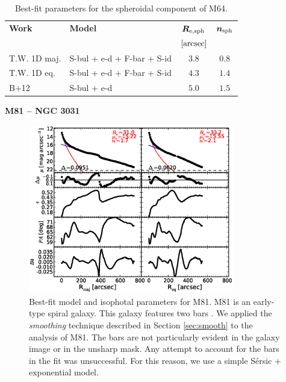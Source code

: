 \documentclass[preprint2]{emulateapj}
\newcommand{\fitfigurewidth}{0.8\textwidth}
\begin{document}
  \begin{table}[h]
  \small
  \caption{Best-fit parameters for the spheroidal component of M64.}
  \begin{center}
  \begin{tabular}{llcc}
  \hline
  {\bf Work} & {\bf Model}   & $\bm R_{\rm e,sph}$    & $\bm n_{\rm sph}$ \\
    &  &  $[\rm arcsec]$ & \\
  \hline
  T.W. 1D maj. & S-bul + e-d + F-bar + S-id  & $3.8$  &  $0.8$ \\
  T.W. 1D eq.  & S-bul + e-d + F-bar + S-id  & $4.3$  &  $1.4$ \\
  \hline
  B+12      & S-bul + e-d  & $5.0$  &  $1.5$ \\
  \hline
  \end{tabular}
  \end{center}
  \label{tab:m64}
  \end{table}


  \clearpage\newpage\noindent
  {\bf M81 -- NGC 3031 \\}

  \begin{figure}[h]
  \begin{center}
  \includegraphics[width=\fitfigurewidth]{images/m81_1Dfit.eps}
  \caption{Best-fit model and isophotal parameters for M81.
  M81 is an early-type spiral galaxy.
  This galaxy features two bars \citep{elmegreen1995m81,gutierrez2011,erwindebattista2013}. 
  We applied the \emph{smoothing} technique described in Section \ref{sec:smooth} to the analysis of M81.
  The bars are not particularly evident in the galaxy image or in the unsharp mask.
  Any attempt to account for the bars in the fit was unsuccessful. 
  For this reason, we use a simple S\'ersic + exponential model. 
  }
  \end{center}
  \end{figure}
\end{document}
